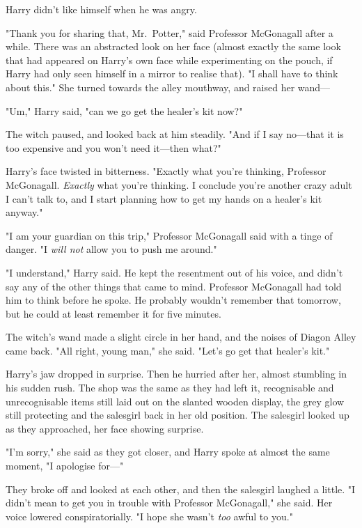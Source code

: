 Harry didn't like himself when he was angry.

"Thank you for sharing that, Mr.~Potter," said Professor McGonagall after a 
while. There was an abstracted look on her face (almost exactly the same look 
that had appeared on Harry's own face while experimenting on the pouch, if 
Harry had only seen himself in a mirror to realise that). "I shall have to 
think about this." She turned towards the alley mouthway, and raised her wand---

"Um," Harry said, "can we go get the healer's kit now?"

The witch paused, and looked back at him steadily. "And if I say no---that it 
is too expensive and you won't need it---then what?"

Harry's face twisted in bitterness. "Exactly what you're thinking, Professor 
McGonagall. \emph{Exactly} what you're thinking. I conclude you're another 
crazy adult I can't talk to, and I start planning how to get my hands on a 
healer's kit anyway."

"I am your guardian on this trip," Professor McGonagall said with a tinge of 
danger. "I \emph{will not} allow you to push me around."

"I understand," Harry said. He kept the resentment out of his voice, and didn't 
say any of the other things that came to mind. Professor McGonagall had told 
him to think before he spoke. He probably wouldn't remember that tomorrow, but 
he could at least remember it for five minutes.

The witch's wand made a slight circle in her hand, and the noises of Diagon 
Alley came back. "All right, young man," she said. "Let's go get that healer's 
kit."

Harry's jaw dropped in surprise. Then he hurried after her, almost stumbling in 
his sudden rush.
\sbreak
The shop was the same as they had left it, recognisable and unrecognisable 
items still laid out on the slanted wooden display, the grey glow still 
protecting and the salesgirl back in her old position. The salesgirl looked up 
as they approached, her face showing surprise.

"I'm sorry," she said as they got closer, and Harry spoke at almost the same 
moment, "I apologise for---"

They broke off and looked at each other, and then the salesgirl laughed a 
little. "I didn't mean to get you in trouble with Professor McGonagall," she 
said. Her voice lowered conspiratorially. "I hope she wasn't \emph{too} awful 
to you."

